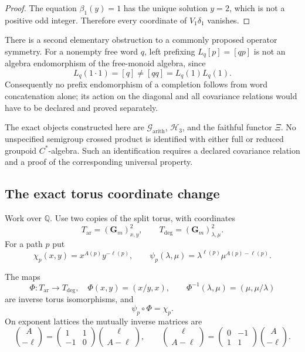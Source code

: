 \begin{proof}
The equation $\beta_1(y)=1$ has the unique solution $y=2$, which is not a
positive odd integer.  Therefore every coordinate of $V_1\delta_1$ vanishes.
\end{proof}

There is a second elementary obstruction to a commonly proposed operator
symmetry.  For a nonempty free word $q$, left prefixing
$L_q[p]=[qp]$ is not an algebra endomorphism of the free-monoid
algebra, since
\[
 L_q(1\cdot1)=[q]\ne[qq]=L_q(1)L_q(1).
\]
Consequently no prefix endomorphism of a completion follows from word
concatenation alone; its action on the diagonal and all covariance relations
would have to be declared and proved separately.

\begin{nonclaim}
The exact objects constructed here are $\mathcal G_{\mathrm{arith}}$,
$\mathcal H_3$, and the faithful functor $\Xi$.  No unspecified semigroup
crossed product is identified with either full or reduced groupoid
$C^*$-algebra.  Such an identification requires a declared covariance
relation and a proof of the corresponding universal property.
\end{nonclaim}

\subsection{The exact torus coordinate change}

Work over $\mathbb Q$.  Use two copies of the split torus, with coordinates
\[
 T_{\mathrm{ar}}=(\mathbf G_m)^2_{x,y},\qquad
 T_{\deg}=(\mathbf G_m)^2_{\lambda,\mu}.
\]
For a path $p$ put
\[
 \chi_p(x,y)=x^{A(p)}y^{-\ell(p)},\qquad
 \psi_p(\lambda,\mu)=\lambda^{\ell(p)}\mu^{A(p)-\ell(p)}.
\]

\begin{theorem}
\label{thm:torus-coordinate-isomorphism}
The maps
\begin{equation}
\label{eq:torus-coordinate-isomorphism}
 \Phi:T_{\mathrm{ar}}\longrightarrow T_{\deg},
 \quad \Phi(x,y)=(x/y,x),
 \qquad
 \Phi^{-1}(\lambda,\mu)=(\mu,\mu/\lambda)
\end{equation}
are inverse torus isomorphisms, and
\begin{equation}
\label{eq:torus-character-intertwining}
 \psi_p\circ\Phi=\chi_p.
\end{equation}
On exponent lattices the mutually inverse matrices are
\begin{equation}
\label{eq:torus-exponent-matrices}
 \binom{A}{-\ell}
 =\begin{pmatrix}1&1\\ -1&0\end{pmatrix}
  \binom{\ell}{A-\ell},
 \qquad
 \binom{\ell}{A-\ell}
 =\begin{pmatrix}0&-1\\ 1&1\end{pmatrix}
  \binom{A}{-\ell}.
\end{equation}
\end{theorem}

